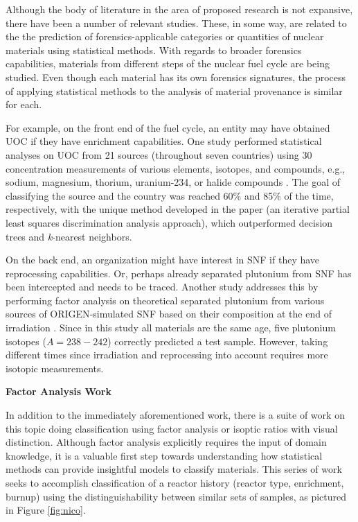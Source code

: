 
Although the body of literature in the area of proposed research is not
expansive, there have been a number of relevant studies. These, in some way,
are related to the the prediction of forensics-applicable categories or
quantities of nuclear materials using statistical methods.  With regards to
broader forensics capabilities, materials from different steps of the nuclear
fuel cycle are being studied.  Even though each material has its own forensics
signatures, the process of applying statistical methods to the analysis of
material provenance is similar for each. 

For example, on the front end of the fuel cycle, an entity may have obtained
\gls{UOC} if they have enrichment capabilities.  One study performed
statistical analyses on \gls{UOC} from 21 sources (throughout seven countries)
using 30 concentration measurements of various elements, isotopes, and
compounds, e.g., sodium, magnesium, thorium, uranium-234, or halide compounds
\cite{robel_2009}.  The goal of classifying the source and the country was
reached 60\% and 85\% of the time, respectively, with the unique method
developed in the paper (an iterative partial least squares discrimination
analysis approach), which outperformed decision trees and \textit{k}-nearest
neighbors.

On the back end, an organization might have interest in \gls{SNF} if they have
reprocessing capabilities.  Or, perhaps already separated plutonium from
\gls{SNF} has been intercepted and needs to be traced. Another study addresses
this by performing factor analysis on theoretical separated plutonium from
various sources of \gls{ORIGEN}-simulated \gls{SNF} based on their composition
at the end of irradiation \cite{nicolaou_pu}.  Since in this study all
materials are the same age, five plutonium isotopes ($A = 238-242$) correctly
predicted a test sample. However, taking different times since irradiation and
reprocessing into account requires more isotopic measurements. 

\noindent \textbf{Factor Analysis Work}

In addition to the immediately aforementioned work, there is a suite of work on
this topic doing classification using factor analysis or isoptic ratios with
visual distinction.  Although factor analysis explicitly requires the input of
domain knowledge, it is a valuable first step towards understanding how
statistical methods can provide insightful models to classify materials.  This
series of work seeks to accomplish classification of a reactor history (reactor
type, enrichment, burnup) using the distinguishability between similar sets of
samples, as pictured in Figure \ref{fig:nico}.

